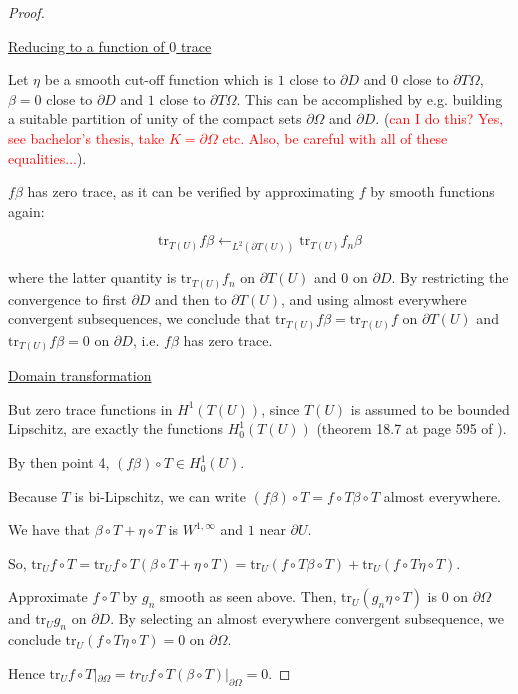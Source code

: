 \documentclass[english,a4paper,10pt,oneside]{scrbook}	%
\theoremstyle{break}
\newenvironment{mproof}[1][\proofname]{%
  \begin{proof}[#1]$ $\par\nobreak\ignorespaces
}{%
  \end{proof}
}
\renewcommand*{\proofname}{Proof}
\theoremstyle{remark}
\newcommand{\tr}{\text{tr}}
\begin{document}
\begin{mproof}
\underline{Reducing to a function of $0$ trace}

Let $\eta$ be a smooth cut-off function which is $1$ close to $\partial D$ and $0$ close to $\partial T\Omega$, $\beta=0$ close to $\partial D$ and $1$ close to $\partial T\Omega$. This can be accomplished by e.g. building a suitable partition of unity of the compact sets $\partial \Omega$ and $\partial D$. (\textcolor{red}{can I do this? Yes, see bachelor's thesis, take $K =\partial \Omega$ etc. Also, be careful with all of these equalities...}).


$f\beta$ has zero trace, as it can be verified by approximating $f$ by smooth functions again: 

$$\tr_{T(U)} f\beta \leftarrow_{L^2(\partial T(U))} \tr_{T(U)} f_n \beta $$

where the latter quantity is $\tr_{T(U)} f_n $ on $\partial T(U)$ and $0$ on $\partial D$. By restricting the convergence  to first $\partial D$ and then to $\partial T(U)$, and using almost everywhere convergent subsequences, we conclude that $\tr_{T(U)} f \beta = \tr_{T(U)} f $ on $\partial T(U)$ and  $\tr_{T(U)} f \beta = 0 $ on $\partial D$, i.e.  $f\beta$ has zero trace.

%

\underline{Domain transformation}

But zero trace functions in $H^1(T(U))$, since $T(U)$ is assumed to be bounded Lipschitz, are exactly the functions $H^1_0(T(U))$ (theorem 18.7 at page 595 of \cite{leoni}).

By then point 4, $(f\beta)\circ T \in H^1_0(U)$.

Because $T$ is bi-Lipschitz, we can write $(f\beta)\circ T = f \circ T \beta \circ T$ almost everywhere.

We have that $\beta \circ T +  \eta \circ T$ is $W^{1,\infty}$ and $1$ near $\partial U$. 

So, $\tr_U f\circ T = \tr_U f\circ T(\beta \circ T +  \eta \circ T) = \tr_U (f\circ T\beta \circ T) + \tr_U (f\circ T  \eta \circ T)$.

Approximate $f\circ T$ by $g_n$ smooth as seen above.  Then, $\tr_U (g_n \eta \circ T)$ is $0$ on $\partial \Omega$ and $\tr_U g_n$ on $\partial D$. By selecting an almost everywhere convergent subsequence, we conclude $\tr_U (f\circ T \eta \circ T) = 0$ on $\partial \Omega$. 

Hence  $\tr_U f\circ T|_{\partial \Omega} = tr_U f\circ T(\beta \circ T)|_{\partial \Omega} = 0$.

\end{mproof}
\end{document}
